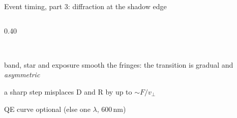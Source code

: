 \begin{frame}{Event timing, part 3: diffraction at the shadow edge}
\begin{columns}[T]
\begin{column}{0.40\textwidth}
\begin{tikzpicture}[font=\scriptsize, xscale=0.6, yscale=1.0]
    \end{tikzpicture}\\[0.3ex]
    \raggedright\scriptsize
    \begin{tightlist}
      \item band, star and exposure smooth the fringes: the transition is gradual and \emph{asymmetric}
      \item a sharp step misplaces D and R by up to $\sim F/v_\perp$
      \item QE curve optional (else one $\lambda$, 600\,nm)
    \end{tightlist}
  \end{column}
  \end{columns}
\end{frame}

